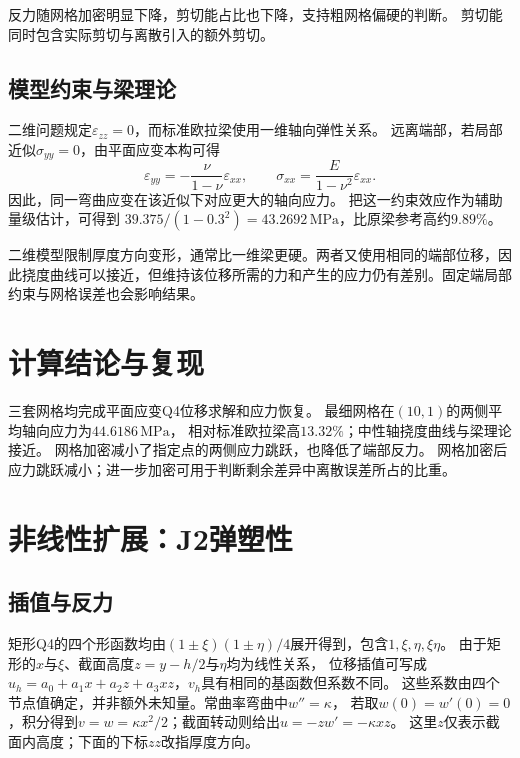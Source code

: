 \documentclass[UTF8,a4paper,fontset=fandol,10pt]{ctexart}
\newcommand{\dd}{\mathop{}\!\mathrm{d}}
\begin{document}
\begin{table}[H]\centering
\caption{位移加载下的弯曲诊断。剪切能为$\frac12\int G\gamma_{xy}^2\dd V$，
挠度差为641个采样点相对于欧拉梁的最大绝对差。}

\end{table}
反力随网格加密明显下降，剪切能占比也下降，支持粗网格偏硬的判断。
剪切能同时包含实际剪切与离散引入的额外剪切。

\subsection{模型约束与梁理论}
二维问题规定$\varepsilon_{zz}=0$，而标准欧拉梁使用一维轴向弹性关系。
远离端部，若局部近似$\sigma_{yy}=0$，由平面应变本构可得
\[
\varepsilon_{yy}=-\frac{\nu}{1-\nu}\varepsilon_{xx},\qquad
\sigma_{xx}=\frac{E}{1-\nu^2}\varepsilon_{xx}.
\]
因此，同一弯曲应变在该近似下对应更大的轴向应力。
把这一约束效应作为辅助量级估计，可得到
$39.375/(1-0.3^2)=43.2692\,\mathrm{MPa}$，比原梁参考高约$9.89\%$。


二维模型限制厚度方向变形，通常比一维梁更硬。两者又使用相同的端部位移，因此挠度曲线可以接近，但维持该位移所需的力和产生的应力仍有差别。固定端局部约束与网格误差也会影响结果。

\section{计算结论与复现}
三套网格均完成平面应变Q4位移求解和应力恢复。
最细网格在$(10,1)$的两侧平均轴向应力为$44.6186\,\mathrm{MPa}$，
相对标准欧拉梁高$13.32\%$；中性轴挠度曲线与梁理论接近。
网格加密减小了指定点的两侧应力跳跃，也降低了端部反力。
网格加密后应力跳跃减小；进一步加密可用于判断剩余差异中离散误差所占的比重。

\clearpage
\section{非线性扩展：J2弹塑性}
\subsection{插值与反力}
矩形Q4的四个形函数均由$(1\pm\xi)(1\pm\eta)/4$展开得到，包含$1,\xi,\eta,\xi\eta$。
由于矩形的$x$与$\xi$、截面高度$z=y-h/2$与$\eta$均为线性关系，
位移插值可写成$u_h=a_0+a_1x+a_2z+a_3xz$，$v_h$具有相同的基函数但系数不同。
这些系数由四个节点值确定，并非额外未知量。常曲率弯曲中$w''=\kappa$，
若取$w(0)=w'(0)=0$，积分得到$v=w=\kappa x^2/2$；截面转动则给出$u=-zw'=-\kappa xz$。
这里$z$仅表示截面内高度；下面的下标$zz$改指厚度方向。
\end{document}

